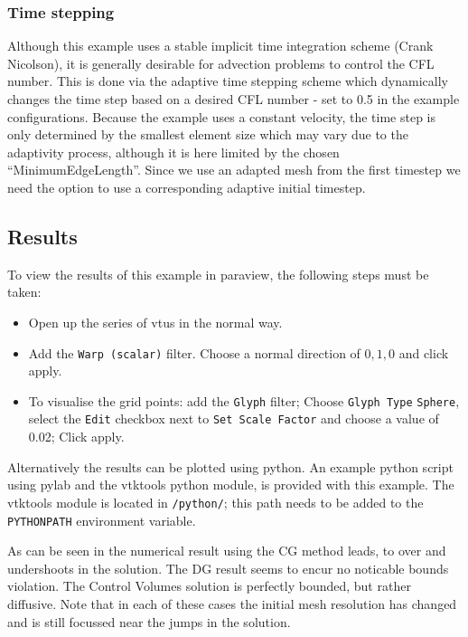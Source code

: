 \subsubsection{Time stepping}
Although this example uses a stable implicit time integration scheme (Crank Nicolson),
it is generally desirable for advection problems to control the CFL number. This is done
via the adaptive time stepping scheme which dynamically changes the time 
step based on a desired CFL number - set to 0.5 in the example configurations. Because the 
example uses a constant velocity, the time step is only determined by the smallest 
element size which may vary due to the adaptivity process, although it is here
limited by the chosen ``MinimumEdgeLength''. Since we use an adapted mesh from the first 
timestep we need the option  to use a corresponding 
adaptive initial timestep.

\subsection{Results}
To view the results of this example in paraview, the following steps
must be taken:
\begin{itemize}
\item Open up the series of vtus in the normal way.
\item Add the \texttt{Warp (scalar)} filter. Choose a normal direction of $0,1,0$ and click apply.
\item To visualise the grid points: add the \texttt{Glyph} filter; Choose \texttt{Glyph Type} \texttt{Sphere},
select the \texttt{Edit} checkbox next to \texttt{Set Scale Factor} and choose a value of 0.02; Click apply.
\end{itemize}

Alternatively the results can be plotted using python. An example python script using pylab and the 
vtktools python module, is provided with this example. The vtktools module is located in 
\texttt{\fluiditysourcepath/python/}; this path needs to be added to the \texttt{PYTHONPATH} environment
variable.

As can be seen in the numerical result using the CG method leads, to over and 
undershoots in the solution. The DG result seems to encur no noticable bounds
violation. The Control Volumes solution is perfectly bounded, but rather diffusive. Note that in each of 
these cases the initial mesh resolution has changed and is still focussed near the jumps in the solution.

